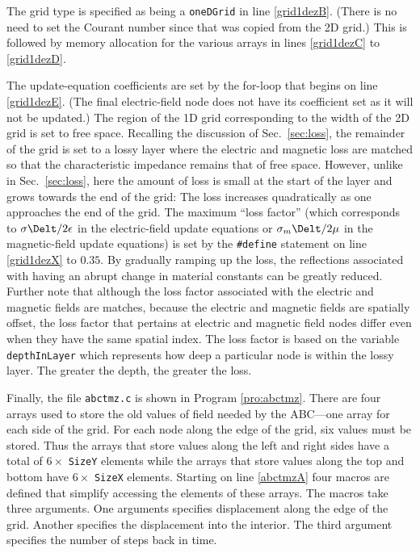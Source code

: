 The grid type is specified as being a {\tt oneDGrid} in line
\ref{grid1dezB}.  (There is no need to set the Courant number since that
was copied from the 2D grid.)  This is followed by memory allocation
for the various arrays in lines \ref{grid1dezC} to \ref{grid1dezD}.

The update-equation coefficients are set by the for-loop that begins
on line \ref{grid1dezE}.  (The final electric-field node does not have
its coefficient set as it will not be updated.)  The region of the 1D
grid corresponding to the width of the 2D grid is set to free space.
Recalling the discussion of Sec.\ \ref{sec:loss}, the remainder of the
grid is set to a lossy layer where the electric and magnetic loss are
matched so that the characteristic impedance remains that of free
space.  However, unlike in Sec.\ \ref{sec:loss}, here the amount of
loss is small at the start of the layer and grows towards the end of
the grid: The loss increases quadratically as one approaches the end
of the grid.  The maximum ``loss factor'' (which corresponds to
$\sigma\Delt/2\epsilon$ in the electric-field update equations or
$\sigma_m\Delt/2\mu$ in the magnetic-field update equations) is set by
the {\tt \#define} statement on line \ref{grid1dezX} to $0.35$.  By
gradually ramping up the loss, the reflections associated with having
an abrupt change in material constants can be greatly reduced.
Further note that although the loss factor associated with the
electric and magnetic fields are matches, because the electric and
magnetic fields are spatially offset, the loss factor that pertains at
electric and magnetic field nodes differ even when they have the same
spatial index.  The loss factor is based on the variable {\tt
  depthInLayer} which represents how deep a particular node is within
the lossy layer.  The greater the depth, the greater the loss.

Finally, the file {\tt abctmz.c} is shown in Program \ref{pro:abctmz}.
There are four arrays used to store the old values of field needed by
the ABC---one array for each side of the grid.  For each node along
the edge of the grid, six values must be stored.  Thus the arrays that
store values along the left and right sides have a total of $6 \times$
{\tt SizeY} elements while the arrays that store values along the top
and bottom have $6 \times$ {\tt SizeX} elements.  Starting on line
\ref{abctmzA} four macros are defined that simplify accessing the
elements of these arrays.  The macros take three arguments.  One
arguments specifies displacement along the edge of the grid.  Another
specifies the displacement into the interior.  The third argument
specifies the number of steps back in time.

